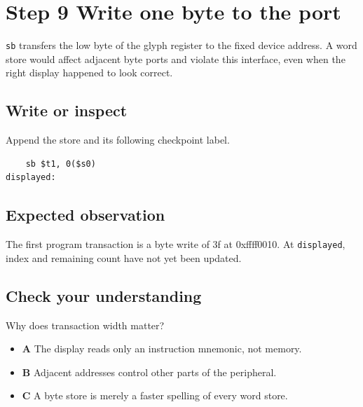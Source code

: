 \section{Step 9 Write one byte to the
  port}\label{005-seven-segment-counter-s09-step-9-write-one-byte-to-the-port}

\texttt{sb} transfers the low byte of the glyph register to the fixed
device address. A word store would affect adjacent byte ports and
violate this interface, even when the right display happened to look
correct.

\subsection{Write or
  inspect}\label{005-seven-segment-counter-s09-write-or-inspect}

Append the store and its following checkpoint label.

\begin{verbatim}
    sb $t1, 0($s0)
displayed:
\end{verbatim}

\subsection{Expected
  observation}\label{005-seven-segment-counter-s09-expected-observation}

The first program transaction is a byte write of 3f at 0xffff0010. At
\texttt{displayed}, index and remaining count have not yet been updated.

\subsection{Check your
  understanding}\label{005-seven-segment-counter-s09-check-your-understanding}

Why does transaction width matter?

\begin{itemize}
  \tightlist
  \item
        \textbf{A} The display reads only an instruction mnemonic, not memory.
  \item
        \textbf{B} Adjacent addresses control other parts of the peripheral.
  \item
        \textbf{C} A byte store is merely a faster spelling of every word
        store.
\end{itemize}
